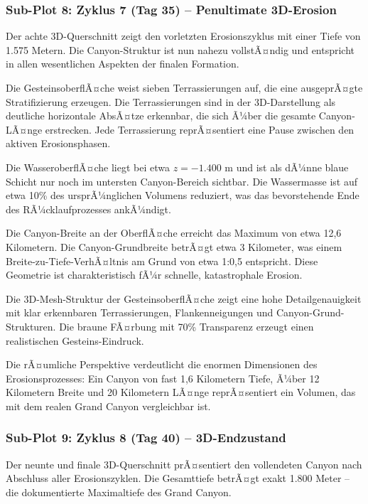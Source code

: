 \subsubsection*{Sub-Plot 8: Zyklus 7 (Tag 35) -- Penultimate 3D-Erosion}

Der achte 3D-Querschnitt zeigt den vorletzten Erosionszyklus mit einer Tiefe von 1.575 Metern. Die Canyon-Struktur ist nun nahezu vollstÃ¤ndig und entspricht in allen wesentlichen Aspekten der finalen Formation.

Die GesteinsoberflÃ¤che weist sieben Terrassierungen auf, die eine ausgeprÃ¤gte Stratifizierung erzeugen. Die Terrassierungen sind in der 3D-Darstellung als deutliche horizontale AbsÃ¤tze erkennbar, die sich Ã¼ber die gesamte Canyon-LÃ¤nge erstrecken. Jede Terrassierung reprÃ¤sentiert eine Pause zwischen den aktiven Erosionsphasen.

Die WasseroberflÃ¤che liegt bei etwa $z = -1.400$ m und ist als dÃ¼nne blaue Schicht nur noch im untersten Canyon-Bereich sichtbar. Die Wassermasse ist auf etwa 10\% des ursprÃ¼nglichen Volumens reduziert, was das bevorstehende Ende des RÃ¼cklaufprozesses ankÃ¼ndigt.

Die Canyon-Breite an der OberflÃ¤che erreicht das Maximum von etwa 12,6 Kilometern. Die Canyon-Grundbreite betrÃ¤gt etwa 3 Kilometer, was einem Breite-zu-Tiefe-VerhÃ¤ltnis am Grund von etwa 1:0,5 entspricht. Diese Geometrie ist charakteristisch fÃ¼r schnelle, katastrophale Erosion.

Die 3D-Mesh-Struktur der GesteinsoberflÃ¤che zeigt eine hohe Detailgenauigkeit mit klar erkennbaren Terrassierungen, Flankenneigungen und Canyon-Grund-Strukturen. Die braune FÃ¤rbung mit 70\% Transparenz erzeugt einen realistischen Gesteins-Eindruck.

Die rÃ¤umliche Perspektive verdeutlicht die enormen Dimensionen des Erosionsprozesses: Ein Canyon von fast 1,6 Kilometern Tiefe, Ã¼ber 12 Kilometern Breite und 20 Kilometern LÃ¤nge reprÃ¤sentiert ein Volumen, das mit dem realen Grand Canyon vergleichbar ist.

\subsubsection*{Sub-Plot 9: Zyklus 8 (Tag 40) -- 3D-Endzustand}

Der neunte und finale 3D-Querschnitt prÃ¤sentiert den vollendeten Canyon nach Abschluss aller Erosionszyklen. Die Gesamttiefe betrÃ¤gt exakt 1.800 Meter -- die dokumentierte Maximaltiefe des Grand Canyon.

